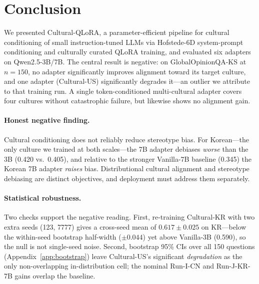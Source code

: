 \documentclass{article}
\begin{document}
\section{Conclusion}
\label{sec:conclusion}

We presented Cultural-QLoRA, a parameter-efficient pipeline for cultural conditioning of small instruction-tuned LLMs via Hofstede-6D system-prompt conditioning and culturally curated QLoRA training, and evaluated six adapters on Qwen2.5-3B/7B. The central result is negative: on GlobalOpinionQA-KS at $n=150$, no adapter significantly improves alignment toward its target culture, and one adapter (Cultural-US) significantly degrades it---an outlier we attribute to that training run. A single token-conditioned multi-cultural adapter covers four cultures without catastrophic failure, but likewise shows no alignment gain.

\paragraph{Honest negative finding.}
Cultural conditioning does not reliably reduce stereotype bias. For Korean---the only culture we trained at both scales---the 7B adapter debiases \emph{worse} than the 3B (0.420 vs.\ 0.405), and relative to the stronger Vanilla-7B baseline (0.345) the Korean 7B adapter \emph{raises} bias. Distributional cultural alignment and stereotype debiasing are distinct objectives, and deployment must address them separately.

\paragraph{Statistical robustness.}
Two checks support the negative reading. First, re-training Cultural-KR with two extra seeds (123, 7777) gives a cross-seed mean of $0.617 \pm 0.025$ on KR---below the within-seed bootstrap half-width ($\pm0.044$) yet above Vanilla-3B (0.590), so the null is not single-seed noise. Second, bootstrap 95\% CIs over all 150 questions (Appendix~\ref{app:bootstrap}) leave Cultural-US's significant \emph{degradation} as the only non-overlapping in-distribution cell; the nominal Run-I-CN and Run-J-KR-7B gains overlap the baseline.
\end{document}
